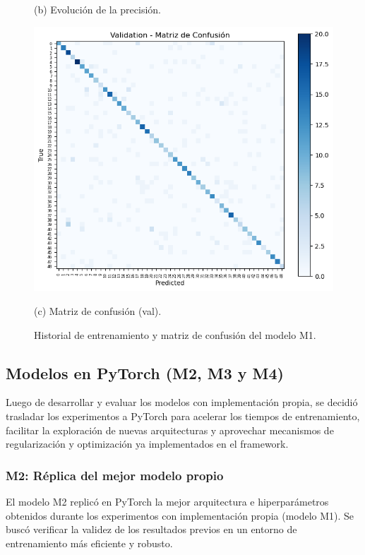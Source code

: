 \documentclass[11pt]{article}
\begin{document}
\begin{figure}[H]
\begin{minipage}[t]{0.32\textwidth}
        \caption*{(b) Evolución de la precisión.}
    \end{minipage}
    \hfill
    \begin{minipage}[t]{0.32\textwidth}
        \centering
        \includegraphics[width=\linewidth]{figures/conf_matrix_m1.png}
        \caption*{(c) Matriz de confusión (val).}
    \end{minipage}
    \caption{Historial de entrenamiento y matriz de confusión del modelo M1.}
    \label{fig:plots-m1}
\end{figure}

\subsection*{Modelos en PyTorch (M2, M3 y M4)}

Luego de desarrollar y evaluar los modelos con implementación propia, se decidió trasladar los experimentos a PyTorch para acelerar los tiempos de entrenamiento, facilitar la exploración de nuevas arquitecturas y aprovechar mecanismos de regularización y optimización ya implementados en el framework.

\subsubsection*{M2: Réplica del mejor modelo propio}

El modelo M2 replicó en PyTorch la mejor arquitectura e hiperparámetros obtenidos durante los experimentos con implementación propia (modelo M1). Se buscó verificar la validez de los resultados previos en un entorno de entrenamiento más eficiente y robusto.
\end{document}
